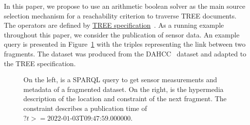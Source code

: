 In this paper, we propose to use an arithmetic boolean solver as the main source selection mechanism for a reachability criterion to traverse TREE documents.
The operators are defined by \href{https://treecg.github.io/specification/}{TREE specification}~.
As a running example throughout this paper, we consider the publication of sensor data.
An example query is presented in Figure~\ref{lst:system} with the triples representing the link between two fragments.
The dataset was produced from the DAHCC~\cite{dahcc_resource} dataset and adapted to the TREE specification.

\begin{figure}[h]
    \begin{minipage}{0.50\textwidth}
        \centering
        
    \end{minipage}
    \hspace{0.05\textwidth}
    \begin{minipage}{0.43\textwidth}
        \centering
        
    \end{minipage}
    \caption{On the left, is a SPARQL query to get sensor measurements and metadata of a fragmented dataset.
    On the right, is the hypermedia description of the location and constraint of the next fragment.
    The constraint describes a publication time of $?t>= \text{2022-01-03T09:47:59.000000}$.}
        \label{lst:system}
\end{figure}